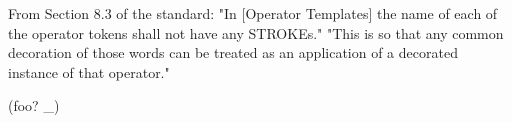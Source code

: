 From Section 8.3 of the standard: 
  "In [Operator Templates] the name of each of the operator
   tokens shall not have any STROKEs."
  "This is so that any common decoration of those words can be treated as
   an application of a decorated instance of that operator."

\begin{zed}
\generic (foo? \_)
\end{zed}
